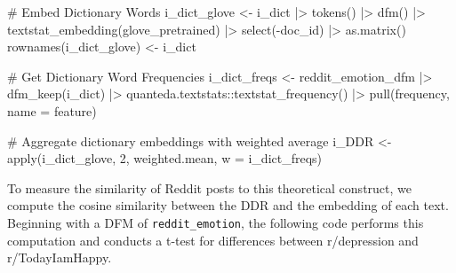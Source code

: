 \documentclass[
  man,
  floatsintext,
  longtable,
  nolmodern,
  notxfonts,
  notimes,
  colorlinks=true,linkcolor=blue,citecolor=blue,urlcolor=blue]{apa7}
\newenvironment{Shaded}{\begin{snugshade}}{\end{snugshade}}
\newcommand{\AttributeTok}[1]{\textcolor[rgb]{0.40,0.45,0.13}{#1}}
\newcommand{\CommentTok}[1]{\textcolor[rgb]{0.37,0.37,0.37}{#1}}
\newcommand{\DecValTok}[1]{\textcolor[rgb]{0.68,0.00,0.00}{#1}}
\newcommand{\FunctionTok}[1]{\textcolor[rgb]{0.28,0.35,0.67}{#1}}
\newcommand{\NormalTok}[1]{\textcolor[rgb]{0.00,0.23,0.31}{#1}}
\newcommand{\OtherTok}[1]{\textcolor[rgb]{0.00,0.23,0.31}{#1}}
\newcommand{\SpecialCharTok}[1]{\textcolor[rgb]{0.37,0.37,0.37}{#1}}
\begin{document}
\begin{Shaded}
\begin{Highlighting}[]
\CommentTok{\# Embed Dictionary Words}
\NormalTok{i\_dict\_glove }\OtherTok{\textless{}{-}}\NormalTok{ i\_dict }\SpecialCharTok{|\textgreater{}} 
  \FunctionTok{tokens}\NormalTok{() }\SpecialCharTok{|\textgreater{}} 
  \FunctionTok{dfm}\NormalTok{() }\SpecialCharTok{|\textgreater{}} 
  \FunctionTok{textstat\_embedding}\NormalTok{(glove\_pretrained) }\SpecialCharTok{|\textgreater{}} 
  \FunctionTok{select}\NormalTok{(}\SpecialCharTok{{-}}\NormalTok{doc\_id) }\SpecialCharTok{|\textgreater{}} 
  \FunctionTok{as.matrix}\NormalTok{()}
\FunctionTok{rownames}\NormalTok{(i\_dict\_glove) }\OtherTok{\textless{}{-}}\NormalTok{ i\_dict}
  
\CommentTok{\# Get Dictionary Word Frequencies}
\NormalTok{i\_dict\_freqs }\OtherTok{\textless{}{-}}\NormalTok{ reddit\_emotion\_dfm }\SpecialCharTok{|\textgreater{}} 
  \FunctionTok{dfm\_keep}\NormalTok{(i\_dict) }\SpecialCharTok{|\textgreater{}} 
\NormalTok{  quanteda.textstats}\SpecialCharTok{::}\FunctionTok{textstat\_frequency}\NormalTok{() }\SpecialCharTok{|\textgreater{}} 
  \FunctionTok{pull}\NormalTok{(frequency, }\AttributeTok{name =}\NormalTok{ feature)}
  
\CommentTok{\# Aggregate dictionary embeddings with weighted average}
\NormalTok{i\_DDR }\OtherTok{\textless{}{-}} \FunctionTok{apply}\NormalTok{(i\_dict\_glove, }\DecValTok{2}\NormalTok{, weighted.mean, }\AttributeTok{w =}\NormalTok{ i\_dict\_freqs)}
\end{Highlighting}
\end{Shaded}

To measure the similarity of Reddit posts to this theoretical construct,
we compute the cosine similarity between the DDR and the embedding of
each text. Beginning with a DFM of \texttt{reddit\_emotion}, the
following code performs this computation and conducts a t-test for
differences between r/depression and r/TodayIamHappy.
\end{document}
